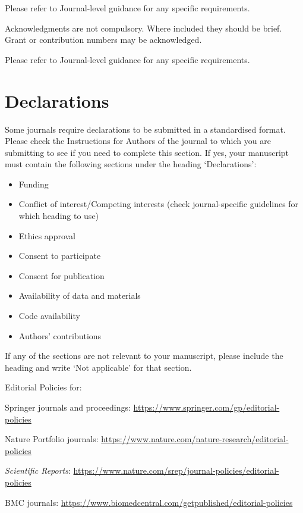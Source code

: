 \documentclass[sn-mathphys]{sn-jnl}%
\begin{document}
Please refer to Journal-level guidance for any specific requirements.


Acknowledgments are not compulsory. Where included they should be brief. Grant or contribution numbers may be acknowledged.

Please refer to Journal-level guidance for any specific requirements.

\section*{Declarations}

Some journals require declarations to be submitted in a standardised format. Please check the Instructions for Authors of the journal to which you are submitting to see if you need to complete this section. If yes, your manuscript must contain the following sections under the heading `Declarations':

\begin{itemize}
\item Funding
\item Conflict of interest/Competing interests (check journal-specific guidelines for which heading to use)
\item Ethics approval 
\item Consent to participate
\item Consent for publication
\item Availability of data and materials
\item Code availability 
\item Authors' contributions
\end{itemize}

\noindent
If any of the sections are not relevant to your manuscript, please include the heading and write `Not applicable' for that section. 

\bigskip
\begin{flushleft}%
Editorial Policies for:

\bigskip\noindent
Springer journals and proceedings: \url{https://www.springer.com/gp/editorial-policies}

\bigskip\noindent
Nature Portfolio journals: \url{https://www.nature.com/nature-research/editorial-policies}

\bigskip\noindent
\textit{Scientific Reports}: \url{https://www.nature.com/srep/journal-policies/editorial-policies}

\bigskip\noindent
BMC journals: \url{https://www.biomedcentral.com/getpublished/editorial-policies}
\end{flushleft}
\end{document}
